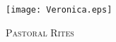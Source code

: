 \fancyhead[RE,LO]{}\fancyhead[RO,LE]{}
\fancyhead[C]{}\thispagestyle{empty}
{}
  \begin{center}
   \texttt{[image: Veronica.eps]}
   \par
   \vspace{2ex}
   	\textsc{\Huge{Pastoral Rites}}
   \end{center}
